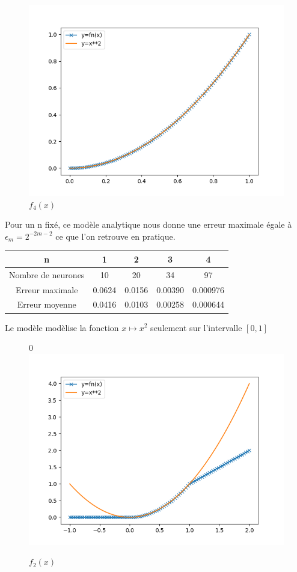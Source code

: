 \documentclass[a4paper,11pt,twoside]{report}
\begin{document}
	
	\begin{figure}[H]
		\begin{center}
			\includegraphics[width=0.7\linewidth]{square_n4.png}
			\caption{$f_4(x)$}
		\end{center}
	\end{figure}
	Pour un n fixé, ce modèle analytique nous donne une erreur maximale égale à $\epsilon_m = 2^{-2m-2}$ ce que l'on retrouve en pratique.
	\begin{center}
		\begin{tabular}{ |c||c|c|c|c| } 
			\hline
			n & 1 & 2 & 3 & 4 \\
			\hline
			\hline
			Nombre de neurones & 10 & 20 & 34 & 97\\
			\hline
			Erreur maximale & 0.0624 & 0.0156 & 0.00390 & 0.000976\\
			\hline
			Erreur moyenne & 0.0416 & 0.0103 & 0.00258 & 0.000644\\
			\hline
		\end{tabular}	
	\end{center}
	Le modèle modèlise la fonction $x\mapsto x^2$ seulement sur l'intervalle $[0,1]$
	
	\begin{figure}[H]
		\begin{center}0
			\includegraphics[width=0.7\linewidth]{prolongement_g.png}
			\caption{$f_2(x)$}
		\end{center}
	\end{figure}
\end{document}
